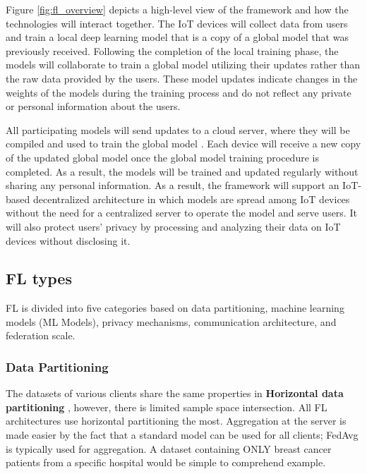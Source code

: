 Figure \ref{fig:fl_overview} depicts a high-level view of the framework and how the technologies will interact together. The IoT devices will collect data from users and train a local deep learning model that is a copy of a global model that was previously received. Following the completion of the local training phase, the models will collaborate to train a global model utilizing their updates rather than the raw data provided by the users. These model updates indicate changes in the weights of the models during the training process and do not reflect any private or personal information about the users.

All participating models will send updates to a cloud server, where they will be compiled and used to train the global model \cite{fl2} \cite{fl3}. Each device will receive a new copy of the updated global model once the global model training procedure is completed. As a result, the models will be trained and updated regularly without sharing any personal information. As a result, the framework will support an IoT-based decentralized architecture in which models are spread among IoT devices without the need for a centralized server to operate the model and serve users. It will also protect users' privacy by processing and analyzing their data on IoT devices without disclosing it.

\subsection{FL types}

FL is divided into five categories \cite{fl26_types} based on data partitioning, machine learning models (ML Models), privacy mechanisms, communication architecture, and federation scale.

\subsubsection{Data Partitioning}

The datasets of various clients share the same properties in \textbf{Horizontal data partitioning} \cite{fl25}, however, there is limited sample space intersection. All FL architectures use horizontal partitioning the most. Aggregation at the server is made easier by the fact that a standard model can be used for all clients; FedAvg is typically used for aggregation. A dataset containing ONLY breast cancer patients from a specific hospital would be simple to comprehend example. 

